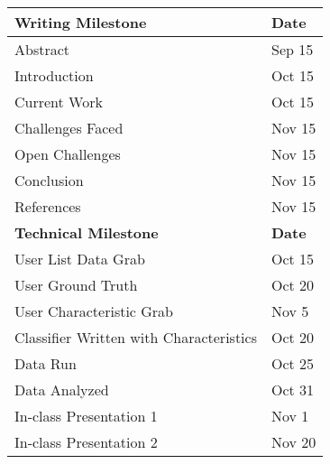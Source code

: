 \begin{table} [h]
\centering
    \begin{tabular}{|l|l|}
    \hline
    \textbf{Writing Milestone}                               & \textbf{Date}    \\ \hline
    Abstract                                & Sep 15 \\
    Introduction                            & Oct 15  \\
    Current Work                            & Oct 15  \\
    Challenges Faced                        & Nov 15  \\
    Open Challenges                         & Nov 15  \\
    Conclusion                              & Nov 15  \\
    References                              & Nov 15  \\ \hline
    \textbf{Technical Milestone}                               & \textbf{Date}    \\ \hline
    User List Data Grab                     & Oct 15  \\
    User Ground Truth                       & Oct 20  \\
    User Characteristic Grab                & Nov 5   \\
    Classifier Written with Characteristics & Oct 20  \\
    Data Run                                & Oct 25  \\
    Data Analyzed                           & Oct 31  \\
    In-class Presentation 1                 & Nov 1   \\
    In-class Presentation 2                 & Nov 20  \\ \hline
    \end{tabular}
\end{table}